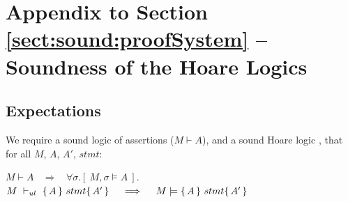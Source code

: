 \section{Appendix to Section \ref{sect:sound:proofSystem} -- Soundness of the Hoare Logics}

\subsection{Expectations}
\begin{axiom}
\label{lemma:axiom:enc:assert:ul}
\label{ax:ul:sound}
We require a sound logic of assertions ($M \vdash A$), and a sound Hoare logic , \ie that for all $M$, $A$, $A'$, $stmt$:
\begin{center}
$M \vdash A   \ \ \ \  \Longrightarrow  \ \ \ \  \forall \sigma.[\ M, \sigma \models A\ ]$.\\
%
%
{$M\ \vdash_{ul}\   \{\, A \, \}\ stmt \{\, A' \, \}  \ \ \ \  \Longrightarrow  \ \ \ \ M \models   \{\, A \, \}\ stmt \{\, A' \, \}$ }
 \end{center}
\end{axiom}

